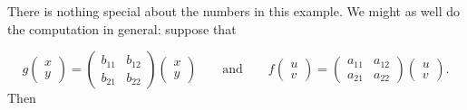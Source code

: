 \documentclass{article}
\begin{document}
There is nothing special about the numbers in this example. We might as well
do the computation in general: suppose that

$$
g\begin{pmatrix} x\\ y \end{pmatrix} =
\begin{pmatrix}
  b_{11} & b_{12} \\
  b_{21} & b_{22}
\end{pmatrix}
\begin{pmatrix}
  x \\ y
\end{pmatrix}\qquad
\text{and}
\qquad
f\begin{pmatrix} u\\ v \end{pmatrix} =
\begin{pmatrix}
  a_{11} & a_{12} \\
  a_{21} & a_{22}
\end{pmatrix}
\begin{pmatrix}
  u \\ v
\end{pmatrix}.
$$
Then
\end{document}
